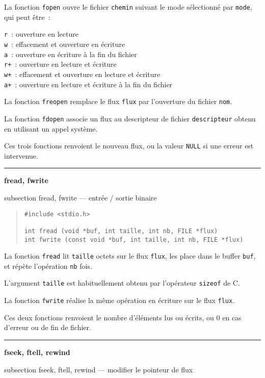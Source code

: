 \documentclass [twoside] {report}
\newcommand {\primitive} [1]
    {
	\phantomsection
	{\large \textbf {#1}}
	\addcontentsline {toc} {subsection} {#1}
    }
\newcommand {\separation}
    {
	\vspace {5mm}
	\nopagebreak
	\hrule
    }
\begin{document}
La fonction \texttt {fopen} ouvre le fichier \texttt {chemin} suivant le
mode sélectionné par \texttt {mode}, qui peut être~: \par
\texttt {r  }: ouverture en lecture \\
\texttt {w  }: effacement et ouverture en écriture \\
\texttt {a  }: ouverture en écriture à la fin du fichier \\
\texttt {r+ }: ouverture en lecture et écriture \\
\texttt {w+ }: effacement et ouverture en lecture et écriture \\
\texttt {a+ }: ouverture en lecture et écriture à la fin du fichier 

La fonction \texttt {freopen} remplace le flux \texttt {flux} par
l'ouverture du fichier \texttt {nom}.

La fonction \texttt {fdopen} associe un flux au descripteur de
fichier \texttt {descripteur} obtenu en utilisant un appel
système.

Ces trois fonctions renvoient le nouveau flux, ou la valeur
\texttt {NULL} si une erreur est intervenue.



\separation
\primitive {fread, fwrite} --- entrée / sortie binaire

\begin {quote}
\begin {verbatim}
#include <stdio.h>

int fread (void *buf, int taille, int nb, FILE *flux)
int fwrite (const void *buf, int taille, int nb, FILE *flux)
\end{verbatim}
\end {quote}

La fonction \texttt {fread} lit \texttt {taille} octets sur le flux
\texttt {flux}, les place dans le buffer \texttt {buf}, et répète
l'opération \texttt {nb} fois.

L'argument \texttt {taille} est habituellement obtenu par
l'opérateur \texttt {sizeof} de C.

La fonction \texttt {fwrite} réalise la même opération en écriture
sur le flux \texttt {flux}.

Ces deux fonctions renvoient le nombre d'éléments lus ou
écrits, ou 0 en cas d'erreur ou de fin de fichier.



\separation
\primitive {fseek, ftell, rewind} --- modifier le pointeur de flux
\end{document}
